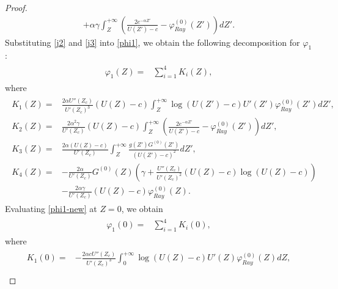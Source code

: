 \documentclass[10pt,a4paper]{amsart}
\begin{document}
\begin{proof}
\begin{align}
							+\alpha\gamma\int_{Z}^{+\infty}\left(\frac{2e^{-\alpha Z'}}{U(Z')-c}-\varphi_{Ray}^{(0)}(Z')\right)dZ'.\label{j3}
						\end{align}
					Substituting \eqref{j2} and \eqref{j3} into \eqref{phi1}, we obtain the following decomposition for $\varphi_1$:
						\begin{align}\label{phi1-new}\begin{aligned}
								\varphi_1(Z)= &\sum_{i=1}^{4}K_i(Z), %
						\end{aligned}\end{align} 
						where
						\begin{align}\begin{aligned}
								K_1(Z)= &\frac{2\alpha U''(Z_c)}{U'(Z_c)^3}(U(Z)-c)\int_{Z}^{+\infty}
								\log(U(Z')-c)
								U'(Z')\varphi_{Ray}^{(0)}(Z')dZ',\\
								K_2(Z)= &\frac{2\alpha^2\gamma}{U'(Z_c)}(U(Z)-c)\int_{Z}^{+\infty}\left(\frac{2e^{-\alpha Z'}}{U(Z')-c}-\varphi_{Ray}^{(0)}(Z')\right)dZ',\\
								K_3(Z)=&\frac{2\alpha (U(Z)-c)}{U'(Z_c)}\int_{Z}^{+\infty}\frac{g(Z')G^{(0)}(Z')}{(U(Z')-c)^2}dZ',\\
								K_4(Z) =& -\frac{2\alpha }{U'(Z_c)}G^{(0)}(Z)\left(\gamma+\frac{U''(Z_c)}{U'(Z_c)^2}(U(Z)-c)\log(U(Z)-c)\right)\\
								&-\frac{2\alpha\gamma}{U'(Z_c)}(U(Z)-c)\varphi_{Ray}^{(0)}(Z).\nonumber
						\end{aligned}\end{align}
Evaluating \eqref{phi1-new} at $Z=0$, we obtain
			\begin{align}\label{est-phi1-0}\begin{aligned}
					\varphi_1(0)= & \sum_{i=1}^{4}K_i(0),
						\end{aligned}\end{align}
		where
			\begin{align}\begin{aligned}
					K_1(0)= &-\frac{2\alpha c U''(Z_c)}{U'(Z_c)^3}\int_{0}^{+\infty}
					\log(U(Z)-c) U'(Z)\varphi_{Ray}^{(0)}(Z)dZ,\\

\end{aligned}
\end{align}
\end{proof}
\end{document}
